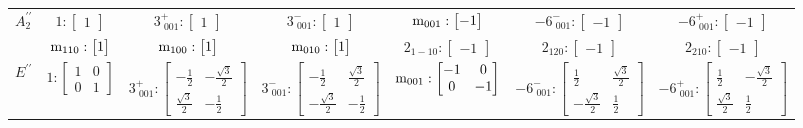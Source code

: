 \documentclass[fleqn,8pt,landscape]{jsarticle}
\begin{document}
\begin{longtable}{ccccccc}
$ A_{2}^{\prime\prime} $ & $ 1:\begin{bmatrix} 1 \end{bmatrix} $ & $ 3^{+}_{\,\,001}:\begin{bmatrix} 1 \end{bmatrix} $ & $ 3^{-}_{\,\,001}:\begin{bmatrix} 1 \end{bmatrix} $ & $ {\rm m}_{001}:\begin{bmatrix} -1 \end{bmatrix} $ & $ -6^{-}_{\,\,001}:\begin{bmatrix} -1 \end{bmatrix} $ & $ -6^{+}_{\,\,001}:\begin{bmatrix} -1 \end{bmatrix} $ \\
& $ {\rm m}_{110}:\begin{bmatrix} 1 \end{bmatrix} $ & $ {\rm m}_{100}:\begin{bmatrix} 1 \end{bmatrix} $ & $ {\rm m}_{010}:\begin{bmatrix} 1 \end{bmatrix} $ & $ 2{}_{1-10}:\begin{bmatrix} -1 \end{bmatrix} $ & $ 2{}_{120}:\begin{bmatrix} -1 \end{bmatrix} $ & $ 2{}_{210}:\begin{bmatrix} -1 \end{bmatrix} $ \\ \hline
$ E^{\prime\prime} $ & $ 1:\begin{bmatrix} 1 & 0 \\ 0 & 1 \end{bmatrix} $ & $ 3^{+}_{\,\,001}:\begin{bmatrix} - \frac{1}{2} & - \frac{\sqrt{3}}{2} \\ \frac{\sqrt{3}}{2} & - \frac{1}{2} \end{bmatrix} $ & $ 3^{-}_{\,\,001}:\begin{bmatrix} - \frac{1}{2} & \frac{\sqrt{3}}{2} \\ - \frac{\sqrt{3}}{2} & - \frac{1}{2} \end{bmatrix} $ & $ {\rm m}_{001}:\begin{bmatrix} -1 & 0 \\ 0 & -1 \end{bmatrix} $ & $ -6^{-}_{\,\,001}:\begin{bmatrix} \frac{1}{2} & \frac{\sqrt{3}}{2} \\ - \frac{\sqrt{3}}{2} & \frac{1}{2} \end{bmatrix} $ & $ -6^{+}_{\,\,001}:\begin{bmatrix} \frac{1}{2} & - \frac{\sqrt{3}}{2} \\ \frac{\sqrt{3}}{2} & \frac{1}{2} \end{bmatrix} $ \\

\end{longtable}
\end{document}
